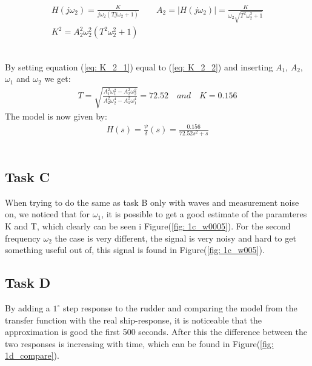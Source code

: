 \begin{equations}
    \begin{align}
        H(j\omega_2) = \frac{K}{j\omega_2(Tj\omega_2 + 1)} \qquad A_2 = |H(j\omega_2)| = \frac{K}{\omega_2\sqrt{T^2\omega_2^2 + 1}} \nonumber \\
        K^2 = A_2^2\omega_2^2(T^2\omega_2^2 + 1) \label{eq: K_2_2}
    \end{align}
\end{equations}
\\
By setting equation (\ref{eq: K_2_1}) equal to (\ref{eq: K_2_2}) and inserting $A_1$, $A_2$, $\omega_1$ and $\omega_2$ we get:
\begin{equation}
    \begin{align}
        T = \sqrt{\frac{A_1^2\omega_1^2 - A_2^2\omega_2^2}{A_2^2\omega_2^4 - A_1^2\omega_1^4}} = 72.52 \quad and \quad K = 0.156
    \end{align}
\end{equation}
\newpage
The model is now given by:
\begin{equation}
    \begin{align}
        H(s) = \frac{\psi}{\delta}(s) = \frac{0.156}{72.52s^2+s}
    \end{align}
\end{equation}
\\

\subsection{Task C}
When trying to do the same as task B only with waves and measurement noise on, we noticed that for $\omega_1$, it is possible to get a good estimate of the paramteres K and T, which clearly can be seen i Figure(\ref{fig: 1c_w0005}). For the second frequency $\omega_2$ the case is very different, the signal is very noisy and hard to get something useful out of, this signal is found in Figure(\ref{fig: 1c_w005}).
\\

\subsection{Task D}
By adding a $1^{\circ}$ step response to the rudder and comparing the model from the transfer function with the real ship-response, it is noticeable that the approximation is good the first 500 seconds. After this the difference between the two responses is increasing with time, which can be found in Figure(\ref{fig: 1d_compare}).


